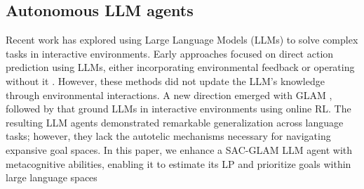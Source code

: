 \subsection{Autonomous LLM agents}
Recent work has explored using Large Language Models (LLMs) to solve complex tasks in interactive environments. Early approaches focused on direct action prediction using LLMs, either incorporating environmental feedback \cite{huang_language_2022, yao2022react, hao2023rap, shinn2023reflexion, wang_voyager_2023} or operating without it \cite{ahn_as_2022}. However, these methods did not update the LLM's knowledge through environmental interactions. A new direction emerged with GLAM \citep{carta_grounding_2023}, followed by \citep{wen_reinforcing_2024,wen_entropy-regularized_2024,zhou_archer_2024} that ground LLMs in interactive environments using online RL. The resulting LLM agents demonstrated remarkable generalization across language tasks; however, they lack the autotelic mechanisms necessary for navigating expansive goal spaces. In this paper, we enhance a SAC-GLAM \cite{gaven2024sacglam} LLM agent with metacognitive abilities, enabling it to estimate its LP and prioritize goals within large language spaces